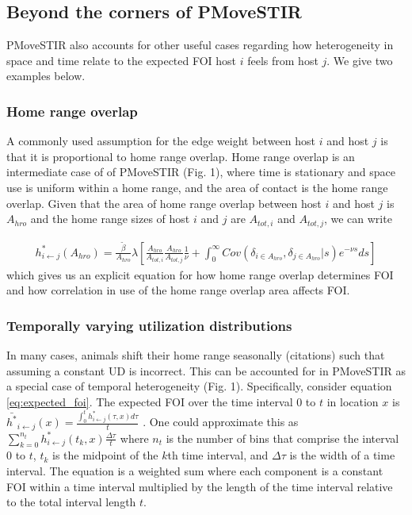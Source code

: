 \documentclass[letterpaper]{article}
\begin{document}
\subsection*{Beyond the corners of PMoveSTIR}

PMoveSTIR also accounts for other useful cases regarding how heterogeneity in space and time relate to the expected FOI host $i$ feels from host $j$.  We give two examples below.

\subsubsection*{Home range overlap}

A commonly used assumption for the edge weight between host $i$ and host $j$ is that it is proportional to home range overlap.  Home range overlap is an intermediate case of of PMoveSTIR (Fig. 1), where time is stationary and space use is uniform within a home range, and the area of contact is the home range overlap.  Given that the area of home range overlap between host $i$ and host $j$ is $A_{hro}$ and the home range sizes of host $i$ and $j$ are $A_{tot, i}$ and $A_{tot, j}$, we can write

\begin{equation}
    \begin{aligned}
    h^*_{i \leftarrow j}(A_{hro}) = \frac{\tilde{\beta}}{A_{hro}} \lambda \left[\frac{A_{hro}}{A_{tot, i}} \frac{A_{hro}}{A_{tot, j}}  \frac{1}{\nu} + \int_{0}^{\infty} Cov(\delta_{i \in A_{hro}}, \delta_{j \in A_{hro}} | s) e^{-\nu s} ds\right]
    \end{aligned}
    \label{eq:home_range}
\end{equation}
which gives us an explicit equation for how home range overlap determines FOI and how correlation in use of the home range overlap area affects FOI. 

\subsubsection*{Temporally varying utilization distributions}

In many cases, animals shift their home range seasonally (citations) such that assuming a constant UD is incorrect. This can be accounted for in PMoveSTIR as a special case of temporal heterogeneity (Fig. 1).  Specifically, consider equation \ref{eq:expected_foi}. The expected FOI over the time interval 0 to $t$ in location $x$ is $\bar{h^*}_{i \leftarrow j}(x) = \frac{\int_0^t h^*_{i \leftarrow j}(\tau, x) d\tau}{t}$ \citep{Wilber2022}.  One could approximate this as $\sum_{k = 0}^{n_t} h^*_{i \leftarrow j}(t_k, x) \frac{\Delta \tau}{t}$ where $n_t$ is the number of bins that comprise the interval 0 to $t$, $t_k$ is the midpoint of the $k$th time interval, and $\Delta \tau$ is the width of a time interval.  The equation is a weighted sum where each component is a constant FOI within a time interval multiplied by the length of the time interval relative to the total interval length $t$.  
\end{document}
